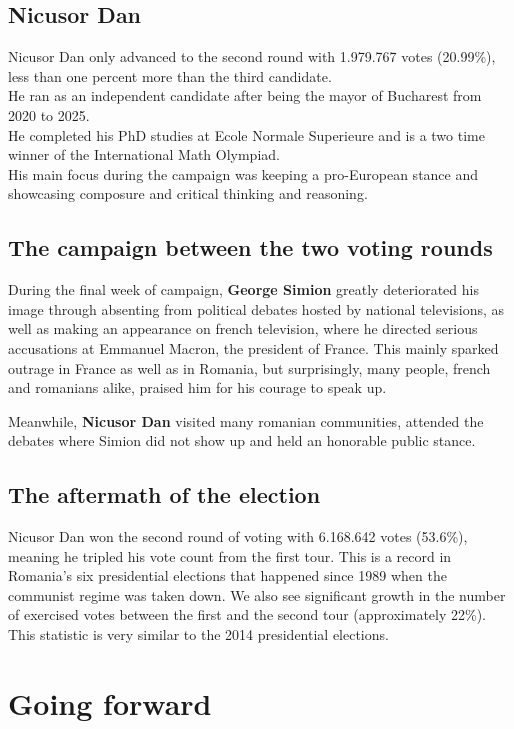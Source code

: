 \documentclass{article}
\begin{document}
\subsection{Nicusor Dan}
Nicusor Dan only advanced to the second round with 1.979.767 votes (20.99\%), less than one percent more than the third candidate.
\\ He ran as an independent candidate after being the mayor of Bucharest from 2020 to 2025.
\\ He completed his PhD studies at Ecole Normale Superieure and is a two time winner of the International Math Olympiad.
\\ His main focus during the campaign was keeping a pro-European stance and showcasing composure and critical thinking and reasoning.

\subsection{The campaign between the two voting rounds}

During the final week of campaign, \textbf{George Simion} greatly deteriorated his image through absenting from political debates hosted by national televisions, as well as making an appearance on french television, where he directed serious accusations at Emmanuel Macron, the president of France. This mainly sparked outrage in France as well as in Romania, but surprisingly, many people, french and romanians alike, praised him for his courage to speak up.

Meanwhile, \textbf{Nicusor Dan} visited many romanian communities, attended the debates where Simion did not show up and held an honorable public stance.

\subsection{The aftermath of the election}

Nicusor Dan won the second round of voting with 6.168.642 votes (53.6\%), meaning he tripled his vote count from the first tour. This is a record in Romania's six presidential elections that happened since 1989 when the communist regime was taken down. We also see significant growth in the number of exercised votes between the first and the second tour (approximately 22\%). This statistic is very similar to the 2014 presidential elections.

\section{Going forward}
\end{document}
